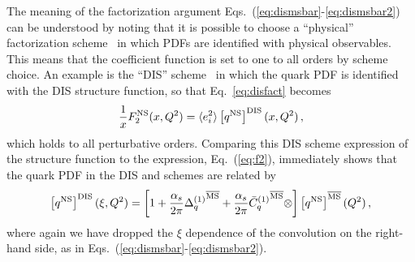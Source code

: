 The  meaning of the factorization argument
Eqs.~(\ref{eq:dismsbar}-\ref{eq:dismsbar2}) can be understood by
noting
that it is possible to choose a ``physical'' factorization
scheme~\cite{Catani:1995ze} in which PDFs are identified with physical
observables. This means that the coefficient function is set to one to
all orders by scheme choice. An example is the ``DIS'' scheme~\cite{Diemoz:1987xu} in which
the quark PDF is identified with the DIS structure function, so that
Eq.~\ref{eq:disfact} becomes
\begin{equation}\label{eq:disfactns}
 \frac{1}{x} F_2^{{\textrm{NS}}}(x,Q^2)= \langle e_i^2\rangle  \left[{q^{{\textrm{NS}}}}\right]^{\textrm{DIS}}(x,Q^2) \,,
 \end{equation}
which holds to all perturbative orders. Comparing this DIS scheme
expression of the structure function to the \msbar{} expression,
Eq.~(\ref{eq:f2}), immediately shows that the quark PDF in the DIS
and \msbar{} schemes are related by
\begin{equation}\label{eq:msbartodis}
\left[{q^{{\textrm{NS}}}}\right]^{\textrm{DIS}}(\xi,Q^2)=
\left[1+\frac{\alpha_s}{2\pi} {\Delta^{(1)}_q}^{{\overline{\textrm{{MS}}}}}
  +\frac{\alpha_s}{2\pi}
  {{{\bar{C}}^{(1)}}_q{}}^{{\overline{\textrm{{MS}}}}}\otimes\right]\left[{q^{{\textrm{NS}}}}\right]^{{\overline{\textrm{{MS}}}}}(Q^2) \,,
\end{equation}
where again we have dropped the $\xi$ dependence of the convolution
on the right-hand side,
as in Eqs.~(\ref{eq:dismsbar}-\ref{eq:dismsbar2}).

